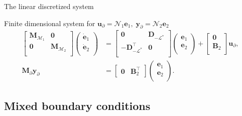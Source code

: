 \documentclass[aspectratio=169]{ISAE-Beamer}
\begin{document}
\begin{frame}{The linear discretized system}
\begin{exampleblock}{Finite dimensional system for $\bm{u}_\partial = \mathcal{N}_1 \displaystyle \bm{e}_1, \;  \bm{y}_\partial = \mathcal{N}_2 \displaystyle \bm{e}_2$}
	\begin{equation*}
	\begin{aligned}
	\begin{bmatrix}
	\mathbf{M}_{\mathcal{M}_1} & \mathbf{0} \\
	\mathbf{0} & \mathbf{M}_{\mathcal{M}_2} \\
	\end{bmatrix}
	\begin{pmatrix}
	\dot{\mathbf{e}}_{1} \\
	\dot{\mathbf{e}}_{2} \\
	\end{pmatrix}
	&= \begin{bmatrix}
	\mathbf{0} & \mathbf{D}_{-\mathcal{L}^*} \\
	- \mathbf{D}_{-\mathcal{L}^*}^\top & \mathbf{0} \\
	\end{bmatrix} 
	\begin{pmatrix}
	\mathbf{e}_{1} \\
	\mathbf{e}_{2} \\
	\end{pmatrix} + 
	\begin{bmatrix}
	\mathbf{0}\\
	\mathbf{B}_2\\
	\end{bmatrix}
	\mathbf{u}_\partial, \\
	\mathbf{M}_\partial {\mathbf{y}_\partial} &= 
	\begin{bmatrix}
	\mathbf{0} & \mathbf{B}_2^\top 
	\end{bmatrix}\begin{pmatrix}
	\mathbf{e}_{1} \\
	\mathbf{e}_{2} \\
	\end{pmatrix}.
	\end{aligned}
	\end{equation*}
\end{exampleblock}
	
\end{frame}


\subsection{Mixed boundary conditions}
\end{document}
